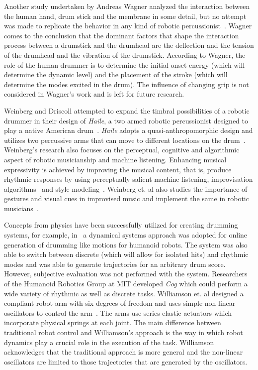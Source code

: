 \documentclass[final,1p,times]{elsarticle}
\begin{document}
Another study undertaken by Andreas Wagner analyzed the interaction between the human hand, drum stick and the membrane in some detail, but no attempt was made to replicate the behavior in any kind of robotic percussionist~\cite{wagner2006analysis}. Wagner comes to the conclusion that the dominant factors that shape the interaction process between a drumstick and the drumhead are the deflection and the tension of the drumhead and the vibration of the drumstick. According to Wagner, the role of the human drummer is to determine the initial onset energy (which will determine the dynamic level) and the placement of the stroke (which will determine the modes excited in the drum). The influence of changing grip is not considered in Wagner's work and is left for future research.

Weinberg and Driscoll attempted to expand the timbral possibilities of
a robotic drummer in their design of \textit{Haile}, a two armed robotic percussionist designed to play a native American drum~\cite{weinberg2006robot}. \textit{Haile} adopts a quasi-anthropomorphic design and utilizes two percussive arms that can move to different locations on the drum~\cite{weinberg2005haile, weinberg2006toward}. Weinberg's research also focuses on the perceptual, cognitive and algorithmic aspect of robotic musicianship and machine listening. Enhancing musical expressivity is achieved by improving the musical content, that is, produce rhythmic responses by using perceptually salient machine listening, improvisation algorithms~\cite{weinberg2007real, weinberg2006jam} and style modeling~\cite{nikolaidis2010playing}. Weinberg et. al also studies the importance of gestures and visual cues in improvised music and implement the same in robotic musicians~\cite{weinberg2007real, weinberg2009interactive}.

Concepts from physics have been successfully utilized for creating drumming systems, for example, in~\cite{degallier2006movement} a dynamical systems approach was adopted for online generation of drumming like motions for humanoid robots. The system was also able to switch between discrete (which will allow for isolated hits) and rhythmic modes and was able to generate trajectories for an arbitrary drum score. However, subjective evaluation was not performed with the system. 
Researchers of the Humanoid Robotics Group at MIT developed \textit{Cog} which could perform a wide variety of rhythmic as well as discrete tasks. Williamson et. al designed a compliant robot arm with six degrees of freedom and uses simple non-linear oscillators to control the arm~\cite{brooks1999cog}. The arms use series elastic actuators which incorporate physical springs at each joint. The main difference between traditional robot control and Williamson's approach is the way in which robot dynamics play a crucial role in the execution of the task. Williamson acknowledges that the traditional approach is more general and the non-linear oscillators are limited to those trajectories that are generated by the oscillators.
\end{document}
